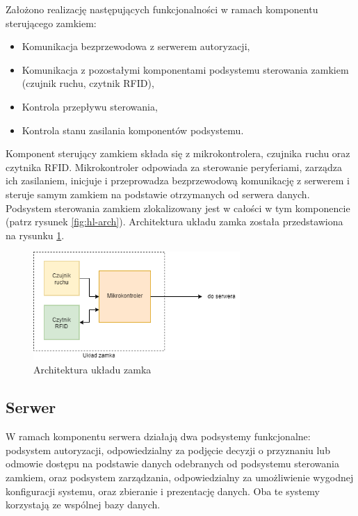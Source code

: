                         Założono realizację następujących funkcjonalności w ramach komponentu sterującego zamkiem:
                        \begin{itemize}
                            \item Komunikacja bezprzewodowa z serwerem autoryzacji,
                            \item Komunikacja z pozostałymi komponentami podsystemu sterowania zamkiem (czujnik ruchu, czytnik RFID),
                            \item Kontrola przepływu sterowania,
                            \item Kontrola stanu zasilania komponentów podsystemu.
                        \end{itemize}

                        Komponent sterujący zamkiem składa się z mikrokontrolera, czujnika ruchu oraz czytnika RFID. Mikrokontroler odpowiada za sterowanie peryferiami, zarządza ich zasilaniem, inicjuje i przeprowadza bezprzewodową komunikację z serwerem i steruje samym zamkiem na podstawie otrzymanych od serwera danych. Podsystem sterowania zamkiem zlokalizowany jest w całości w tym komponencie (patrz rysunek \ref{fig:hl-arch}). Architektura układu zamka została przedstawiona na rysunku \ref{fig:lock-arch}. 

                        \begin{figure}
                                \centering
                                \includegraphics[width=0.7\textwidth]{chapters/images/lock.png}
                                \caption{Architektura układu zamka}
                                \label{fig:lock-arch}
                        \end{figure}

                \subsection{Serwer}
                        W ramach komponentu serwera działają dwa podsystemy funkcjonalne: podsystem autoryzacji, odpowiedzialny za podjęcie decyzji o przyznaniu lub odmowie dostępu na podstawie danych odebranych od podsystemu sterowania zamkiem, oraz podsystem zarządzania, odpowiedzialny za umożliwienie wygodnej konfiguracji systemu, oraz zbieranie i prezentację danych. Oba te systemy korzystają ze wspólnej bazy danych.


